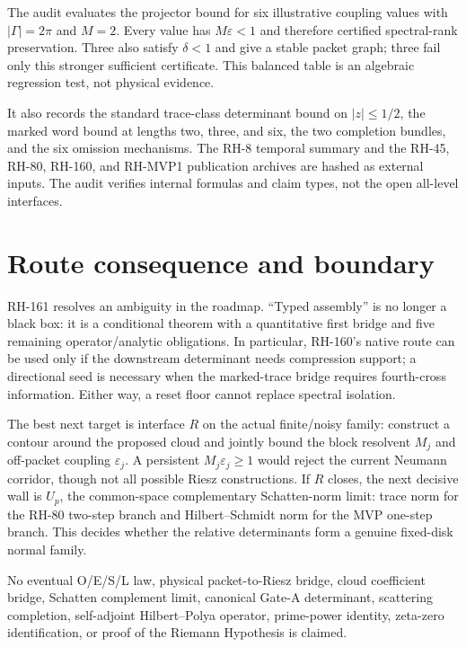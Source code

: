 \documentclass[11pt]{article}
\theoremstyle{definition}
\theoremstyle{remark}
\begin{document}
The audit evaluates the projector bound for six illustrative coupling
values with $|\Gamma|=2\pi$ and $M=2$.  Every value has
$M\varepsilon<1$ and therefore certified spectral-rank preservation.  Three
also satisfy $\delta<1$ and give a stable packet graph; three fail only this
stronger sufficient certificate.  This balanced table is an algebraic
regression test, not physical evidence.

It also records the standard trace-class determinant bound on
$|z|\leq1/2$, the marked word bound at lengths two, three, and six, the two
completion bundles, and the six omission mechanisms.  The RH-8 temporal
summary and the RH-45, RH-80, RH-160, and RH-MVP1 publication archives are
hashed as external inputs.  The audit verifies internal formulas and claim
types, not the open all-level interfaces.

\section{Route consequence and boundary}

RH-161 resolves an ambiguity in the roadmap.  ``Typed assembly'' is no
longer a black box: it is a conditional theorem with a quantitative first
bridge and five remaining operator/analytic obligations.  In particular,
RH-160's native route can be used only if the downstream determinant needs
compression support; a directional seed is necessary when the marked-trace
bridge requires fourth-cross information.  Either way, a reset floor cannot
replace spectral isolation.

The best next target is interface $R$ on the actual finite/noisy family:
construct a contour around the proposed cloud and jointly bound the block
resolvent $M_j$ and off-packet coupling $\varepsilon_j$.  A persistent
$M_j\varepsilon_j\geq1$ would reject the current Neumann corridor, though not
all possible Riesz constructions.  If $R$ closes, the next decisive wall is
$U_p$, the common-space complementary Schatten-norm limit: trace norm for
the RH-80 two-step branch and Hilbert--Schmidt norm for the MVP one-step
branch.  This decides whether the relative determinants form a genuine
fixed-disk normal family.

No eventual O/E/S/L law, physical packet-to-Riesz bridge, cloud coefficient
bridge, Schatten complement limit, canonical Gate-A determinant, scattering
completion, self-adjoint Hilbert--Polya operator, prime-power identity,
zeta-zero identification, or proof of the Riemann Hypothesis is claimed.



\end{document}
